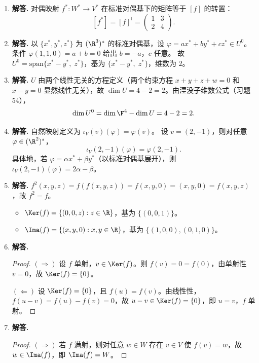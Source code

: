 \begin{enumerate}[label=\textbf{\arabic*.}, leftmargin=*, itemsep=1em]
\item \textbf{解答.}
对偶映射 $f^*\colon W^*\to V^*$ 在标准对偶基下的矩阵等于 $[f]$ 的转置：
\[
  [f^*]=[f]^\mathsf{t}=\begin{pmatrix}1&3\\2&4\end{pmatrix}.
\]

\item \textbf{解答.}
以 $\{x^*,y^*,z^*\}$ 为 $(\R^3)^*$ 的标准对偶基，设 $\varphi=ax^*+by^*+cz^*\in U^0$。
条件 $\varphi(1,1,0)=a+b=0$ 给出 $b=-a$，$c$ 任意。
故 $U^0=\mathrm{span}\{x^*-y^*,\;z^*\}$，基为 $\{x^*-y^*,\;z^*\}$，维数为 $2$。

\item \textbf{解答.}
$U$ 由两个线性无关的方程定义（两个约束方程 $x+y+z+w=0$ 和 $x-y=0$ 显然线性无关），故 $\dim U=4-2=2$。由湮没子维数公式（习题54），
\[
  \dim U^0=\dim\F^4-\dim U=4-2=2.
\]

\item \textbf{解答.}
自然映射定义为 $\iota_V(v)(\varphi)=\varphi(v)$。
设 $v=(2,-1)$，则对任意 $\varphi\in(\R^2)^*$，
\[
  \iota_V(2,-1)(\varphi)=\varphi(2,-1).
\]
具体地，若 $\varphi=\alpha x^*+\beta y^*$（以标准对偶基展开），则 $\iota_V(2,-1)(\varphi)=2\alpha-\beta$。

\item \textbf{解答.}
$f^2(x,y,z)=f(f(x,y,z))=f(x,y,0)=(x,y,0)=f(x,y,z)$，故 $f^2=f$。
\begin{itemize}
  \item $\Ker(f)=\{(0,0,z):z\in\R\}$，基为 $\{(0,0,1)\}$。
  \item $\Ima(f)=\{(x,y,0):x,y\in\R\}$，基为 $\{(1,0,0),(0,1,0)\}$。
\end{itemize}


\item \textbf{解答.}
\begin{proof}
$(\Rightarrow)$ 设 $f$ 单射，$v\in\Ker(f)$。则 $f(v)=0=f(0)$，由单射性 $v=0$，故 $\Ker(f)=\{0\}$。

$(\Leftarrow)$ 设 $\Ker(f)=\{0\}$，且 $f(u)=f(v)$。由线性性，$f(u-v)=f(u)-f(v)=0$，故 $u-v\in\Ker(f)=\{0\}$，即 $u=v$，$f$ 单射。
\end{proof}

\item \textbf{解答.}
\begin{proof}
$(\Rightarrow)$ 若 $f$ 满射，则对任意 $w\in W$ 存在 $v\in V$ 使 $f(v)=w$，故 $w\in\Ima(f)$，即 $\Ima(f)=W$。


\end{proof}
\end{enumerate}

